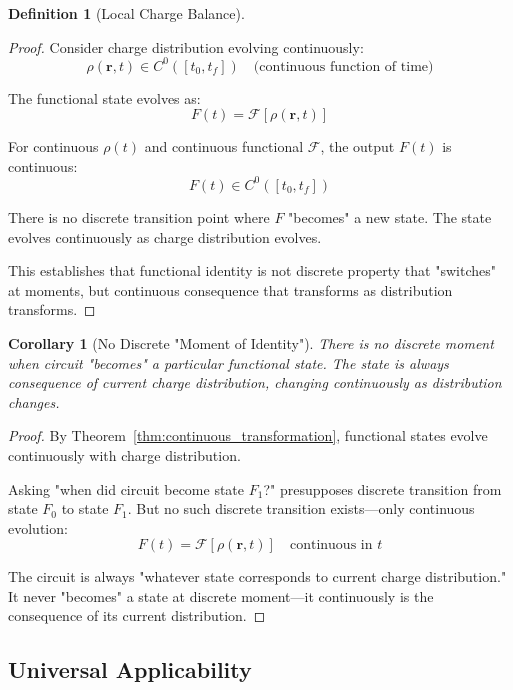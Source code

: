 \documentclass[12pt,a4paper]{article}
\theoremstyle{plain}
\newtheorem{corollary}[theorem]{Corollary}
\theoremstyle{definition}
\newtheorem{definition}[theorem]{Definition}
\theoremstyle{remark}
\begin{document}
\begin{definition}[Local Charge Balance]
\begin{proof}
Consider charge distribution evolving continuously:
\begin{equation}
\rho(\mathbf{r},t) \in C^0([t_0, t_f]) \quad \text{(continuous function of time)}
\end{equation}

The functional state evolves as:
\begin{equation}
F(t) = \mathcal{F}[\rho(\mathbf{r},t)]
\end{equation}

For continuous $\rho(t)$ and continuous functional $\mathcal{F}$, the output $F(t)$ is continuous:
\begin{equation}
F(t) \in C^0([t_0, t_f])
\end{equation}

There is no discrete transition point where $F$ "becomes" a new state. The state evolves continuously as charge distribution evolves.

This establishes that functional identity is not discrete property that "switches" at moments, but continuous consequence that transforms as distribution transforms.
\end{proof}

\begin{corollary}[No Discrete "Moment of Identity"]
\label{cor:no_moment}
There is no discrete moment when circuit "becomes" a particular functional state. The state is always consequence of current charge distribution, changing continuously as distribution changes.
\end{corollary}

\begin{proof}
By Theorem~\ref{thm:continuous_transformation}, functional states evolve continuously with charge distribution.

Asking "when did circuit become state $F_1$?" presupposes discrete transition from state $F_0$ to state $F_1$. But no such discrete transition exists—only continuous evolution:
\begin{equation}
F(t) = \mathcal{F}[\rho(\mathbf{r},t)] \quad \text{continuous in } t
\end{equation}

The circuit is always "whatever state corresponds to current charge distribution." It never "becomes" a state at discrete moment—it continuously is the consequence of its current distribution.
\end{proof}

\subsection{Universal Applicability}


\end{definition}
\end{document}
